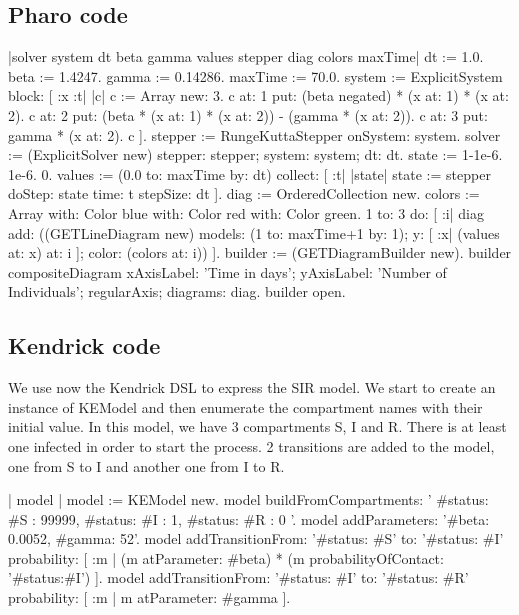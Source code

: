 \documentclass[a4paper,10pt,twoside]{book}
\begin{document}
\subsection{ Pharo code}

\begin{code}{}
|solver system dt beta gamma values stepper diag colors maxTime|
dt := 1.0.
beta := 1.4247.
gamma := 0.14286.
maxTime := 70.0.
system := ExplicitSystem block: [ :x :t| |c|
     c := Array new: 3.
     c at: 1 put: (beta negated) * (x at: 1) * (x at: 2).
     c at: 2 put: (beta * (x at: 1) * (x at: 2)) - (gamma * (x at: 2)).
     c at: 3 put: gamma * (x at: 2).
     c
     ].
stepper := RungeKuttaStepper onSystem: system.
solver := (ExplicitSolver new) stepper: stepper; system: system; dt: dt.
state := { 1-1e-6. 1e-6. 0}.
values := (0.0 to: maxTime by: dt) collect: [ :t| |state| state := stepper doStep: state
                                                          time: t stepSize: dt ].
diag := OrderedCollection new.
colors := Array with: Color blue with: Color red with: Color green.
1 to: 3 do: [ :i|
    diag add:
        ((GETLineDiagram new)
            models: (1 to: maxTime+1 by: 1);
            y: [ :x| (values at: x) at: i ];
            color: (colors at: i))
     ].
builder := (GETDiagramBuilder new).
builder compositeDiagram
    xAxisLabel: 'Time in days';
    yAxisLabel: 'Number of Individuals';
    regularAxis;
    diagrams: diag.
builder open.
\end{code}

\subsection{ Kendrick code}
We use now the Kendrick DSL to express the SIR model.
We start to create an instance of KEModel and then enumerate the compartment names with their initial value.
In this model, we have 3 compartments S, I and R.
There is at least one infected in order to start the process.
2 transitions are added to the model, one from S to I and another one from I to R.


\begin{code}{}
| model |
	model := KEModel new.
	model
		buildFromCompartments:
			'{
		{ #status: #S }: 99999,
		{ #status: #I }: 1,
		{ #status: #R }: 0
	}'.
	model addParameters: '{#beta: 0.0052, #gamma: 52}'.
	model
		addTransitionFrom: '{#status: #S}'
		to: '{#status: #I}'
		probability: [ :m | (m atParameter: #beta) * (m probabilityOfContact: '{#status:#I}') ].
	model addTransitionFrom: '{#status: #I}' to: '{#status: #R}' probability: [ :m | m atParameter: #gamma ].
\end{code}
\end{document}
